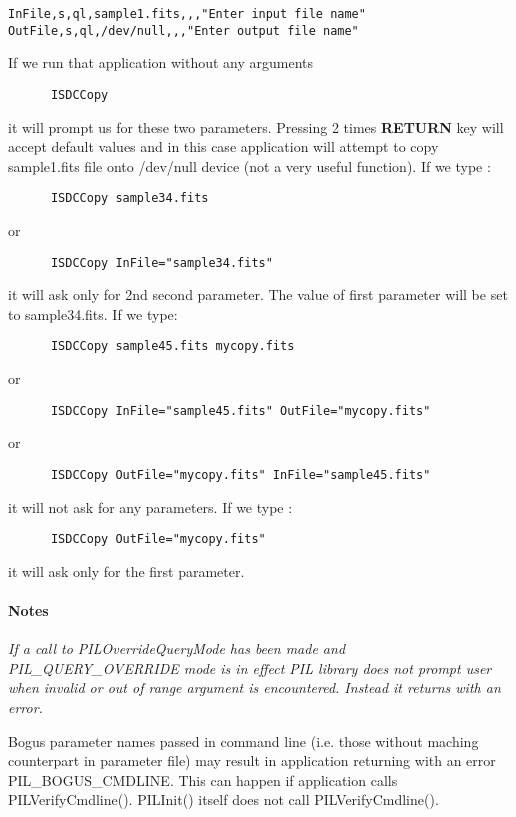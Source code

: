 \begin{verbatim}
InFile,s,ql,sample1.fits,,,"Enter input file name" 
OutFile,s,ql,/dev/null,,,"Enter output file name" 
\end{verbatim}

If we run that application without any arguments 

\begin{verbatim}
      ISDCCopy
\end{verbatim}

it will prompt us for these two parameters. Pressing 2 times {\bf RETURN} key
will accept default values and in this case application will attempt to copy
sample1.fits file onto /dev/null device (not a very useful function).
If we type : 

\begin{verbatim}
      ISDCCopy sample34.fits
\end{verbatim}

or 

\begin{verbatim}
      ISDCCopy InFile="sample34.fits"
\end{verbatim}

it will ask only for 2nd second parameter. The value of first parameter will
be set to sample34.fits. If we
type: 

\begin{verbatim}
      ISDCCopy sample45.fits mycopy.fits
\end{verbatim}

or 

\begin{verbatim}
      ISDCCopy InFile="sample45.fits" OutFile="mycopy.fits"
\end{verbatim}

or 

\begin{verbatim}
      ISDCCopy OutFile="mycopy.fits" InFile="sample45.fits"
\end{verbatim}

it will not ask for any parameters. If we type : 

\begin{verbatim}
      ISDCCopy OutFile="mycopy.fits"
\end{verbatim}

it will ask only for the first parameter. 

\paragraph{Notes\\}
{\it
If a call to PILOverrideQueryMode has been made and PIL\_QUERY\_OVERRIDE
mode is in effect PIL library does not prompt user when invalid or out
of range argument is encountered. Instead it returns with an error.

Bogus parameter names passed in command line (i.e. those without maching
counterpart in parameter file) may result in application returning 
with an error PIL\_BOGUS\_CMDLINE. This can happen if application calls
PILVerifyCmdline(). PILInit() itself does not call PILVerifyCmdline().
}

